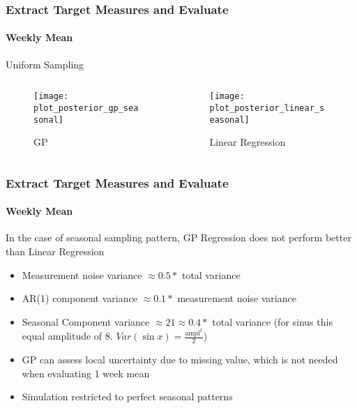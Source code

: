 \documentclass[
	8pt, %
]{beamer}
\begin{document}
\begin{frame}
	\frametitle{Extract Target Measures and Evaluate}
	\framesubtitle{Weekly Mean} %

	Uniform Sampling
	\begin{columns}[c] %
		\begin{column}{0.45\textwidth} %
				\begin{figure}
					\texttt{[image: plot\_posterior\_gp\_seasonal]}
					\caption{GP}

				\end{figure}
		\end{column}
		\begin{column}{0.5\textwidth} %
				\begin{figure}
					\texttt{[image: plot\_posterior\_linear\_seasonal]}
					\caption{Linear Regression}
				\end{figure}

		\end{column}
	\end{columns}

\end{frame}


\begin{frame}
	\frametitle{Extract Target Measures and Evaluate}
	\framesubtitle{Weekly Mean} %

	In the case of seasonal sampling pattern, GP Regression does not perform better than Linear Regression

	\begin{itemize}
		\item Measurement noise variance $\approx 0.5 *$ total variance
		\item AR(1) component variance $\approx 0.1 *$ measurement noise variance
		\item Seasonal Component variance $\approx 21 \approx 0.4 *$ total variance (for sinus this equal amplitude of 8. $Var(\sin{x}) = \frac{\text{ampl}^2}{2}$)
		\item GP can assess local uncertainty due to missing value, which is not needed when evaluating 1 week mean
		\item Simulation restricted to perfect seasonal patterns
	\end{itemize}

\end{frame}
\end{document}
